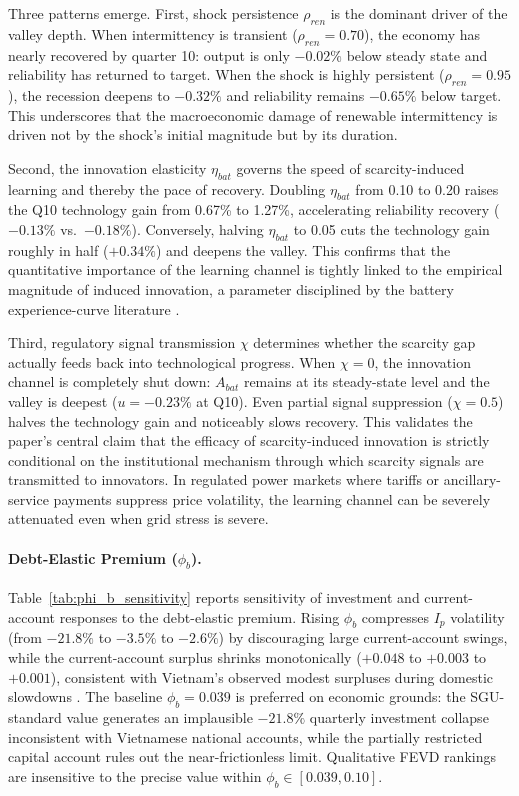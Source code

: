 	Three patterns emerge. First, shock persistence $\rho_{ren}$ is the dominant driver of the valley depth. When intermittency is transient ($\rho_{ren}=0.70$), the economy has nearly recovered by quarter 10: output is only $-0.02\%$ below steady state and reliability has returned to target. When the shock is highly persistent ($\rho_{ren}=0.95$), the recession deepens to $-0.32\%$ and reliability remains $-0.65\%$ below target. This underscores that the macroeconomic damage of renewable intermittency is driven not by the shock's initial magnitude but by its duration.
	
	Second, the innovation elasticity $\eta_{bat}$ governs the speed of scarcity-induced learning and thereby the pace of recovery. Doubling $\eta_{bat}$ from 0.10 to 0.20 raises the Q10 technology gain from 0.67\% to 1.27\%, accelerating reliability recovery ($-0.13\%$ vs.\ $-0.18\%$). Conversely, halving $\eta_{bat}$ to 0.05 cuts the technology gain roughly in half ($+0.34\%$) and deepens the valley. This confirms that the quantitative importance of the learning channel is tightly linked to the empirical magnitude of induced innovation, a parameter disciplined by the battery experience-curve literature \citep{kittner2017, way2022}.
	
	Third, regulatory signal transmission $\chi$ determines whether the scarcity gap actually feeds back into technological progress. When $\chi=0$, the innovation channel is completely shut down: $A_{bat}$ remains at its steady-state level and the valley is deepest ($u=-0.23\%$ at Q10). Even partial signal suppression ($\chi=0.5$) halves the technology gain and noticeably slows recovery. This validates the paper's central claim that the efficacy of scarcity-induced innovation is strictly conditional on the institutional mechanism through which scarcity signals are transmitted to innovators. In regulated power markets where tariffs or ancillary-service payments suppress price volatility, the learning channel can be severely attenuated even when grid stress is severe.
	
	\paragraph{Debt-Elastic Premium ($\phi_b$).} Table~\ref{tab:phi_b_sensitivity} reports sensitivity of investment and current-account responses to the debt-elastic premium. Rising $\phi_b$ compresses $I_p$ volatility (from $-21.8\%$ to $-3.5\%$ to $-2.6\%$) by discouraging large current-account swings, while the current-account surplus shrinks monotonically ($+0.048$ to $+0.003$ to $+0.001$), consistent with Vietnam's observed modest surpluses during domestic slowdowns \citep{worldbank2024}. The baseline $\phi_b = 0.039$ is preferred on economic grounds: the SGU-standard value generates an implausible $-21.8\%$ quarterly investment collapse inconsistent with Vietnamese national accounts, while the partially restricted capital account rules out the near-frictionless limit. Qualitative FEVD rankings are insensitive to the precise value within $\phi_b \in [0.039, 0.10]$.

